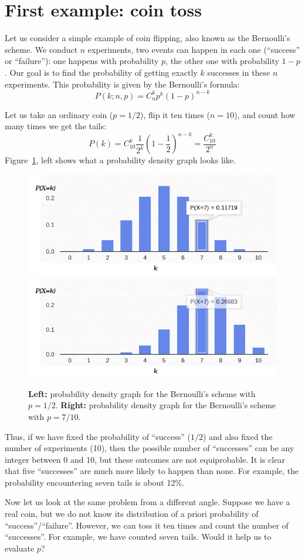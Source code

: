 \documentclass[notitlepage]{report}
\begin{document}
\section{First example: coin toss}
Let us consider a simple example of coin flipping, also known as the Bernoulli's scheme. 
We conduct $n$ experiments, two events can happen in each one (``success'' or ``failure''): 
one happens with probability $p$, the other one with probability $1-p$. 
Our goal is to find the probability of getting exactly $k$ successes in these $n$ experiments. 
This probability is given by the Bernoulli's formula:
$$
P(k;n,p) = C_n^k p^k (1-p)^{n-k}
$$

Let us take an ordinary coin ($p=1/2$), flip it ten times ($n=10$), and count how many times we get the tails:
$$P(k) = C_{10}^k \frac{1}{2^k}\left(1-\frac{1}{2}\right)^{n-k} = \frac{C_{10}^k}{2^n}$$
Figure~\ref{fig:binomial}, left shows what a probability density graph looks like.

\begin{figure}[htb!]
\centering
\includegraphics[width=.48\columnwidth]{binomial-05.png}
\includegraphics[width=.48\columnwidth]{binomial-07.png}
\caption{\textbf{Left:} probability density graph for the Bernoulli's scheme with $p=1/2$. \textbf{Right:} probability density graph for the Bernoulli's scheme with $p=7/10$.}
\label{fig:binomial}
\end{figure}

Thus, if we have fixed the probability of ``success'' ($1/2$) and also fixed the number of experiments (10), 
then the possible number of ``successes'' can be any integer between 0 and 10, but these outcomes are not equiprobable. 
It is clear that five ``successes'' are much more likely to happen than none. For example, the probability encountering seven tails is about 12\%.

Now let us look at the same problem from a different angle. 
Suppose we have a real coin, but we do not know its distribution of a priori probability of ``success''/``failure''. 
However, we can toss it ten times and count the number of ``successes''. 
For example, we have counted seven tails.
Would it help us to evaluate $p$?
\end{document}
